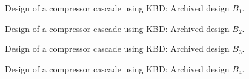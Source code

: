 \begin{figure}[h!]
\begin{minipage}[b]{1\linewidth}
 \centering
\end{minipage}
\caption{Design of a compressor cascade using KBD: Archived design $B_1$.} 
\label{CBR_a}
\end{figure}

\begin{figure}[h!]
\begin{minipage}[b]{1\linewidth}
 \centering
\end{minipage}
\caption{Design of a compressor cascade using KBD: Archived design $B_2$.} 
\label{CBR_b}
\end{figure}

\begin{figure}[h!]
\begin{minipage}[b]{1\linewidth}
 \centering
\end{minipage}
\caption{Design of a compressor cascade using KBD: Archived design $B_3$.} 
\label{CBR_c}
\end{figure}

\begin{figure}[h!]
\begin{minipage}[b]{1\linewidth}
 \centering
\end{minipage}
\caption{Design of a compressor cascade using KBD: Archived design $B_4$.} 
\label{CBR_d}
\end{figure}



